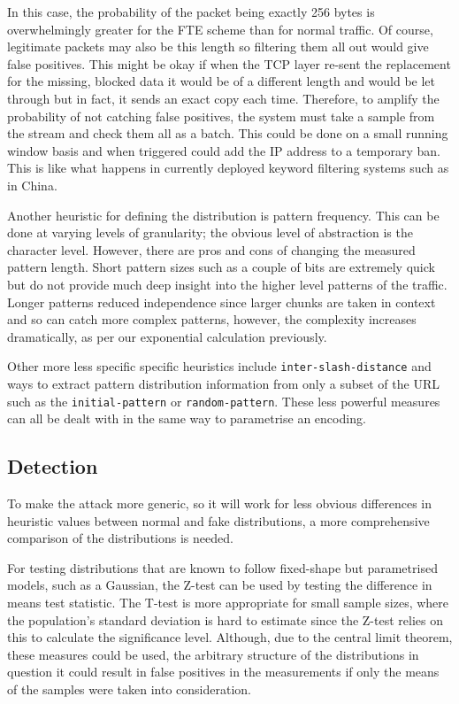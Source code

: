 \documentclass[ %
                    author={Samuel Russell},
                supervisor={Prof. Bogdan Warinschi},
                    degree={MEng},
                     title={Innocuous Ciphertexts},
                  subtitle={The DE-CENSOR Scheme},
                      type={Research},
                      year={2018} ]{dissertation}
\begin{document}
In this case, the probability of the packet being exactly 256 bytes is overwhelmingly greater for the FTE scheme than for normal traffic.
Of course, legitimate packets may also be this length so filtering them all out would give false positives.
This might be okay if when the TCP layer re-sent the replacement for the missing, blocked data it would be of a different length and would be let through but in fact, it sends an exact copy each time.
Therefore, to amplify the probability of not catching false positives, the system must take a sample from the stream and check them all as a batch.
This could be done on a small running window basis and when triggered could add the IP address to a temporary ban.
This is like what happens in currently deployed keyword filtering systems such as in China.

Another heuristic for defining the distribution is pattern frequency.
This can be done at varying levels of granularity; the obvious level of abstraction is the character level. However, there are pros and cons of changing the measured pattern length.
Short pattern sizes such as a couple of bits are extremely quick but do not provide much deep insight into the higher level patterns of the traffic.
Longer patterns reduced independence since larger chunks are taken in context and so can catch more complex patterns, however, the complexity increases dramatically, as per our exponential calculation previously.

Other more less specific specific heuristics include \texttt{inter-slash-distance} and ways to extract pattern distribution information from only a subset of the URL such as the \texttt{initial-pattern} or \texttt{random-pattern}. These less powerful measures can all be dealt with in the same way to parametrise an encoding.

\subsection{Detection}

To make the attack more generic, so it will work for less obvious differences in heuristic values between normal and fake distributions, a more comprehensive comparison of the distributions is needed.

For testing distributions that are known to follow fixed-shape but parametrised models, such as a Gaussian, the Z-test can be used by testing the difference in means test statistic.
The T-test is more appropriate for small sample sizes, where the population's standard deviation is hard to estimate since the Z-test relies on this to calculate the significance level.
Although, due to the central limit theorem, these measures could be used, the arbitrary structure of the distributions in question it could result in false positives in the measurements if only the means of the samples were taken into consideration.
\end{document}
